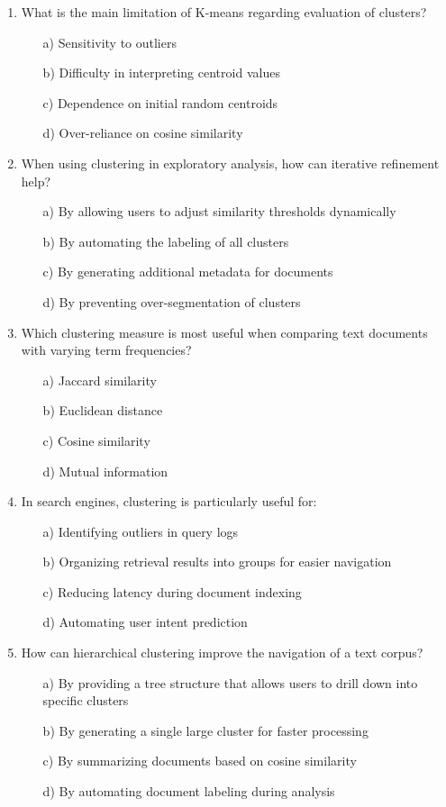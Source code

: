 \documentclass[8pt]{extarticle}
\begin{document}
\begin{multicols}{2}
\begin{enumerate}
\item What is the main limitation of K-means regarding evaluation of clusters?
\begin{itemize}
\item[a)] Sensitivity to outliers
\item[b)] Difficulty in interpreting centroid values
\item[c)] Dependence on initial random centroids
\item[d)] Over-reliance on cosine similarity
\end{itemize}

\item When using clustering in exploratory analysis, how can iterative refinement help?
\begin{itemize}
\item[a)] By allowing users to adjust similarity thresholds dynamically
\item[b)] By automating the labeling of all clusters
\item[c)] By generating additional metadata for documents
\item[d)] By preventing over-segmentation of clusters
\end{itemize}

\item Which clustering measure is most useful when comparing text documents with varying term frequencies?
\begin{itemize}
\item[a)] Jaccard similarity
\item[b)] Euclidean distance
\item[c)] Cosine similarity
\item[d)] Mutual information
\end{itemize}

\item In search engines, clustering is particularly useful for:
\begin{itemize}
\item[a)] Identifying outliers in query logs
\item[b)] Organizing retrieval results into groups for easier navigation
\item[c)] Reducing latency during document indexing
\item[d)] Automating user intent prediction
\end{itemize}

\item How can hierarchical clustering improve the navigation of a text corpus?
\begin{itemize}
\item[a)] By providing a tree structure that allows users to drill down into specific clusters
\item[b)] By generating a single large cluster for faster processing
\item[c)] By summarizing documents based on cosine similarity
\item[d)] By automating document labeling during analysis
\end{itemize}


\end{enumerate}
\end{multicols}
\end{document}
